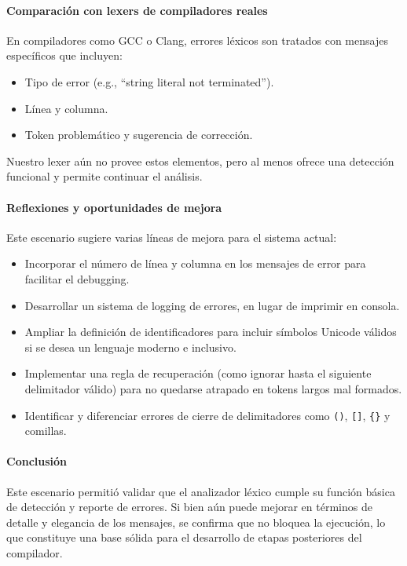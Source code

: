 \documentclass{article}
\begin{document}
\paragraph{Comparación con lexers de compiladores reales}

En compiladores como GCC o Clang, errores léxicos son tratados con mensajes específicos que incluyen:

\begin{itemize}
  \item Tipo de error (e.g., “string literal not terminated”).
  \item Línea y columna.
  \item Token problemático y sugerencia de corrección.
\end{itemize}

Nuestro lexer aún no provee estos elementos, pero al menos ofrece una detección funcional y permite continuar el análisis.

\paragraph{Reflexiones y oportunidades de mejora}

Este escenario sugiere varias líneas de mejora para el sistema actual:

\begin{itemize}
  \item Incorporar el número de línea y columna en los mensajes de error para facilitar el debugging.
  \item Desarrollar un sistema de logging de errores, en lugar de imprimir en consola.
  \item Ampliar la definición de identificadores para incluir símbolos Unicode válidos si se desea un lenguaje moderno e inclusivo.
  \item Implementar una regla de recuperación (como ignorar hasta el siguiente delimitador válido) para no quedarse atrapado en tokens largos mal formados.
  \item Identificar y diferenciar errores de cierre de delimitadores como \texttt{()}, \texttt{[]}, \texttt{\{\}} y comillas.
\end{itemize}


\paragraph{Conclusión}

Este escenario permitió validar que el analizador léxico cumple su función básica de detección y reporte de errores. Si bien aún puede mejorar en términos de detalle y elegancia de los mensajes, se confirma que no bloquea la ejecución, lo que constituye una base sólida para el desarrollo de etapas posteriores del compilador.
\end{document}
